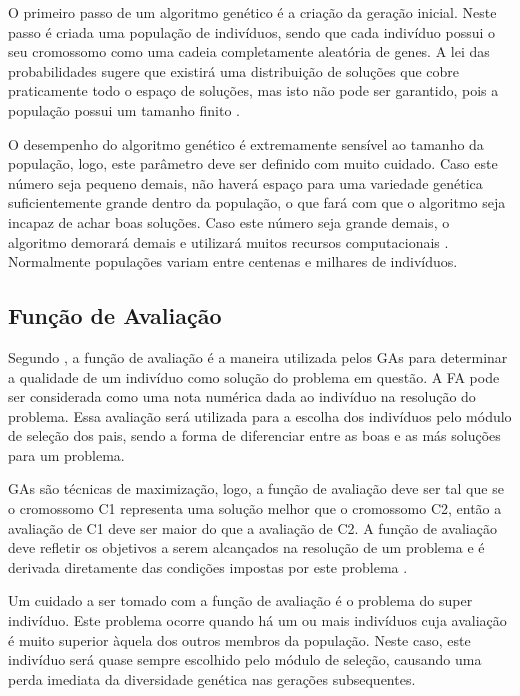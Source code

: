 \documentclass[12pt,oneside,a4paper,english,french,spanish,brazil,]{abntex2}
\begin{document}
O primeiro passo de um algoritmo genético é a criação da geração inicial. Neste passo é criada uma população de indivíduos, sendo que cada indivíduo possui o seu cromossomo como uma cadeia completamente aleatória de genes. A lei das probabilidades sugere que existirá uma distribuição de soluções que cobre praticamente todo o espaço de soluções, mas isto não pode ser garantido, pois a população possui um tamanho finito \cite{linden:2008}.

O desempenho do algoritmo genético é extremamente sensível ao tamanho da população, logo, este parâmetro deve ser definido com muito cuidado. Caso este número seja pequeno demais, não haverá espaço para uma variedade genética suficientemente grande dentro da população, o que fará com que o algoritmo seja incapaz de achar boas soluções. Caso este número seja grande demais, o algoritmo demorará demais e utilizará muitos recursos computacionais  \cite{linden:2008}. Normalmente populações variam entre centenas e milhares de indivíduos.

\subsection{Função de Avaliação}
\label{sec:Funcao_de_Avaliacao}

Segundo \citet{linden:2008}, a função de avaliação é a maneira utilizada pelos GAs para determinar a qualidade de um indivíduo como solução do problema em questão. A FA pode ser considerada como uma nota numérica dada ao indivíduo na resolução do problema. Essa avaliação será utilizada para a escolha dos indivíduos pelo módulo de seleção dos pais, sendo a forma de diferenciar entre as boas e as más soluções para um problema.

GAs são técnicas de maximização, logo, a função de avaliação deve ser tal que se o cromossomo C1 representa uma solução melhor que o cromossomo C2, então a avaliação de C1 deve ser maior do que a avaliação de C2. A função de avaliação deve refletir os objetivos a serem alcançados na resolução de um problema e é derivada diretamente das condições impostas por este problema \cite{holland:1992}.

Um cuidado a ser tomado com a função de avaliação é o problema do super indivíduo. Este problema ocorre quando há um ou mais indivíduos cuja avaliação é muito superior àquela dos outros membros da população. Neste caso, este indivíduo será quase sempre escolhido pelo módulo de seleção, causando uma perda imediata da diversidade genética nas gerações subsequentes.
\end{document}
